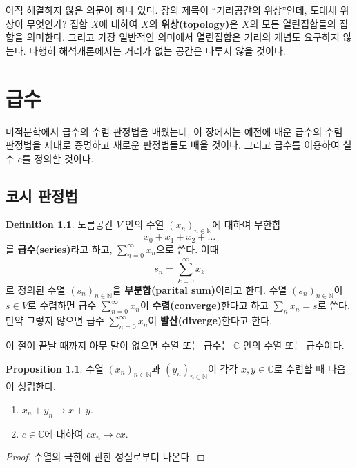 \documentclass[11pt]{book}
\numberwithin{equation}{chapter}
\def\NN{\mathbb{N}}
\def\CC{\mathbb{C}}
\theoremstyle{definition}
\newtheorem{prop}[thm]{Proposition}
\newtheorem{defn}[thm]{Definition}
\begin{document}
아직 해결하지 않은 의문이 하나 있다. 장의 제목이 ``거리공간의 위상''인데, 도대체 위상이 무엇인가? 집합 \(X\)에 대하여 \(X\)의 \textbf{위상(topology)}은 \(X\)의 모든 열린집합들의 집합을 의미한다. 그리고 가장 일반적인 의미에서 열린집합은 거리의 개념도 요구하지 않는다. 다행히 해석개론에서는 거리가 없는 공간은 다루지 않을 것이다.



\chapter{급수}

미적분학에서 급수의 수렴 판정법을 배웠는데, 이 장에서는 예전에 배운 급수의 수렴 판정법을 제대로 증명하고 새로운 판정법들도 배울 것이다. 그리고 급수를 이용하여 실수 \(e\)를 정의할 것이다. 


\section{코시 판정법}

\begin{defn}
    노름공간 \(V\) 안의 수열 \((x_n)_{n \in \NN}\)에 대하여 무한합
    \[
    x_0 + x_1 + x_2 + \ldots    
    \]
    를 \textbf{급수(series)}라고 하고, \(\sum_{n=0}^\infty x_n\)으로 쓴다. 이때
    \[
    s_n = \sum_{k=0}^\infty x_k    
    \]
    로 정의된 수열 \((s_n)_{n \in \NN}\)을 \textbf{부분합(parital sum)}이라고 한다. 수열 \((s_n)_{n \in \NN}\)이 \(s \in V\)로 수렴하면 급수 \(\sum_{n=0}^\infty x_n\)이 \textbf{수렴(converge)}한다고 하고 \(\sum_n x_n = s\)로 쓴다. 만약 그렇지 않으면 급수 \(\sum_{n=0}^\infty x_n\)이 \textbf{발산(diverge)}한다고 한다.
\end{defn}

이 절이 끝날 때까지 아무 말이 없으면 수열 또는 급수는 \(\CC\) 안의 수열 또는 급수이다.

\begin{prop}
    수열 \((x_n)_{n \in \NN}\)과 \((y_n)_{n \in \NN}\)이 각각 \(x, y \in \CC\)로 수렴할 때 다음이 성립한다.
    \begin{enumerate} [label=(\alph*), leftmargin=2\parindent]
        \item
        \(x_n + y_n \to x + y\).
        \item
        \(c \in \CC\)에 대하여 \(cx_n \to cx\).
    \end{enumerate}
\end{prop}
\begin{proof}
    수열의 극한에 관한 성질로부터 나온다.
\end{proof}
\end{document}
